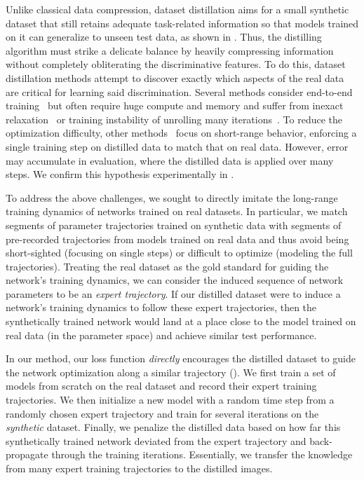 \documentclass[main.tex]{subfiles}
\begin{document}
Unlike classical data compression, dataset distillation aims for a small synthetic dataset that still retains adequate task-related information so that models trained on it can generalize to unseen test data, as shown in . Thus, the distilling algorithm must strike a delicate balance by heavily compressing information without completely obliterating the discriminative features.  
To do this, dataset distillation methods attempt to discover exactly which aspects of the real data are critical for learning said discrimination. Several methods consider end-to-end training~\cite{dd,nguyen2020dataset,nguyen2021dataset} but often require huge compute and memory and suffer from inexact relaxation~\cite{nguyen2020dataset,nguyen2021dataset} or training instability of unrolling many iterations~\cite{dd,maclaurin2015gradient}. To reduce the optimization difficulty, other methods~\cite{dc,dsa} focus on short-range behavior, enforcing a single training step on distilled data to match that on real data. However, error may accumulate in evaluation, where the distilled data is applied over many steps. We confirm this hypothesis experimentally in .


To address the above challenges, we sought to directly imitate the long-range training dynamics of networks trained on real datasets. In particular, we match segments of parameter trajectories trained on synthetic data with segments of pre-recorded trajectories from models trained on real data and thus avoid being short-sighted (\ie focusing on single steps) or difficult to optimize (\ie modeling the full trajectories). 
Treating the real dataset as the gold standard for guiding the network's training dynamics, we can consider the induced sequence of network parameters to be an \emph{expert trajectory}. If our distilled dataset were to induce a network's training dynamics to follow these expert trajectories, then the synthetically trained network would land at a place close to the model trained on real data (in the parameter space) and achieve similar test performance. %




In our method, our loss function \textit{directly} encourages the distilled dataset to guide the network optimization along a similar trajectory (). We first train a set of models from scratch on the real dataset and record their expert training trajectories. We then initialize a new model with a random time step from a randomly chosen expert trajectory and train for several iterations on the \textit{synthetic} dataset. Finally, we penalize the distilled data based on how far this synthetically trained network deviated from the expert trajectory and back-propagate through the training iterations. Essentially, we transfer the knowledge from many expert training trajectories to the distilled images. 
\end{document}
